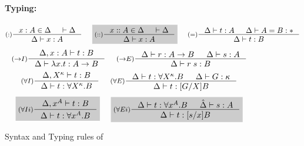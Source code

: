 \begin{figure}
\begin{framed}
\paragraph{Typing:}
\[ \inference[($:$)]{x:A \in \Delta & |- \Delta} 
                    {\Delta |- x:A}
 ~~~~ \newFi{
   \inference[($::$)]{x::A \in \Delta & |- \Delta} 
                     {\Delta |- x:A} }
 ~~~~
   \inference[($=$)]{\Delta |- t :A & \Delta |- A = B : *}
                    {\Delta |- t : B}
\]
\[
   \inference[($->$$I$)]{\Delta, x:A |- t : B}
                        {\Delta |- \lambda x.t : A -> B}
 ~~~~
   \inference[($->$$E$)]{\Delta |- r : A -> B & \Delta |- s : A}
                        {\Delta |- r\;s : B}
\]
\[ \inference[($\forall I$)]{\Delta, X^\kappa |- t : B}
                            {\Delta |- t : \forall X^\kappa.B}
 ~~~~
   \inference[($\forall E$)]{ \Delta |- t : \forall X^\kappa.B
                            & \Delta |- G:\kappa }
                            {\Delta |- t : [G/X]B}
\]
\[ \newFi{
   \inference[($\forall I i$)]{\Delta, x^A |- t : B}
                              {\Delta |- t : \forall x^A.B} }
 ~~~~ \newFi{
   \inference[($\forall E i$)]{ \Delta |- t : \forall x^A.B
                              & \hat\Delta |- s:A}
                              {\Delta |- t : [s/x]B} }
\]
\end{framed}\vspace*{-1em}
\caption{Syntax and Typing rules of \Fi}
\label{fig:Fi}
\end{figure}


